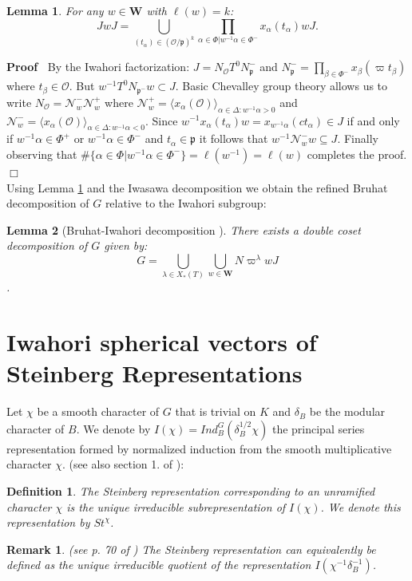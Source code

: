 \documentclass{article}
\newenvironment{proof}{\noindent\textbf{Proof\ }}{\hspace*{\fill}$\Box$\medskip}
\newtheorem{lemma}{Lemma}
\newtheorem{definition}{Definition}
\newtheorem{remark}{Remark}
\begin{document}
\begin{lemma}\label{cosrep}
    For any $w\in\mathbf{W}$ with $\ell(w)=k$: $$JwJ=\underset{(t_{\alpha})\in(\mathcal{O}/\mathfrak{p})^k}{\bigcup}\prod\limits_{\alpha\in\Phi|w^{-1}\alpha\in\Phi^-}x_{\alpha}(t_{\alpha})wJ.$$
\end{lemma}
\begin{proof}
By the Iwahori factorization: $J=N_{\mathcal{O}}T^0N_{\mathfrak{p}}^-$ and $N_{\mathfrak{p}}^-=\prod\limits_{\beta\in\Phi^-}x_{\beta}(\varpi t_{\beta})$ where $t_{\beta}\in\mathcal{O}$. But $w^{-1}T^0N_{\mathfrak{p}^-}w\subset J$. Basic Chevalley group theory allows us to write $N_{\mathcal{O}}=\mathcal{N}_w^{-}\mathcal{N}_w^{+}$ where $\mathcal{N}_w^{+}=\langle x_{\alpha}(\mathcal{O})\rangle_{\alpha\in\Delta:w^{-1}\alpha>0}$ and $\mathcal{N}_w^{-}=\langle x_{\alpha}(\mathcal{O})\rangle_{\alpha\in\Delta:w^{-1}\alpha<0}$. Since
$w^{-1}x_{\alpha}(t_{\alpha})w=x_{w^{-1}\alpha}(ct_{\alpha})\in J$ if and only if $w^{-1}\alpha\in\Phi^+$ or $w^{-1}\alpha\in\Phi^-$ and $t_{\alpha}\in\mathfrak{p}$ it follows that $w^{-1}\mathcal{N}_w^{-}w\subseteq J$. Finally observing that $\#\{\alpha\in\Phi|w^{-1}\alpha\in\Phi^-\}=\ell(w^{-1})=\ell(w)$ completes the proof.
\end{proof}\\
Using Lemma \ref{cosrep} and the Iwasawa decomposition we obtain the refined Bruhat decomposition of $G$ relative to the Iwahori subgroup:
 \begin{lemma}[Bruhat-Iwahori decomposition \cite{iwmats}]\label{decomp} 
 There exists a double coset decomposition of $G$ given by:
    $$G=\underset{\lambda\in X_*(T)}{\bigcup}\underset{w\in\mathbf{W}}{\bigcup}N\varpi^{\lambda}wJ$$.
 \end{lemma}

 \section{Iwahori spherical vectors of Steinberg Representations}
 Let $\chi$ be a smooth character of $G$ that is trivial on $K$ and $\delta_B$ be the modular character of $B$. We denote by $I(\chi)=Ind_B^{G}(\delta_B^{1/2}\chi)$ the principal series representation formed by normalized induction from the smooth multiplicative character $\chi$. (see also section 1. of \cite{shal}):
 \begin{definition}
     The Steinberg representation corresponding to an unramified character $\chi$ is the unique irreducible subrepresentation of $I(\chi)$. We denote this representation by ${St}^{\chi}$.
 \end{definition}
 \begin{remark} (see p. 70 of \cite{cassnotes})
     The Steinberg representation can equivalently be defined as the unique irreducible quotient of the representation $I(\chi^{-1}\delta_B^{-1})$.
 \end{remark}
\end{document}
